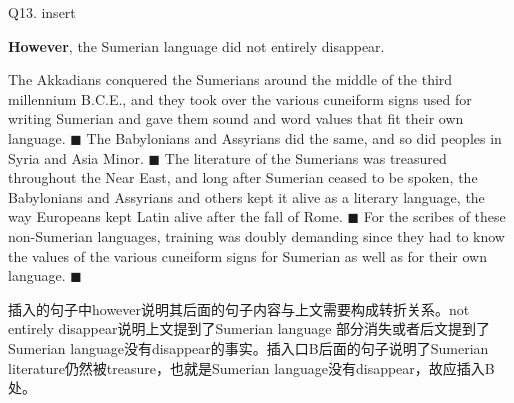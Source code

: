 \begin{blk}
    \begin{qst}
        Q13. insert

        \textbf{However}, the Sumerian language did not entirely disappear.
    \end{qst}

    \begin{psgq}
        The Akkadians conquered the Sumerians around the middle of the third millennium B.C.E., and they took over the various cuneiform signs used for writing Sumerian and gave them sound and word values that fit their own language. $\blacksquare$ The Babylonians and Assyrians did the same, and so did peoples in Syria and Asia Minor. $\blacksquare$ The literature of the Sumerians was treasured throughout the Near East, and long after Sumerian ceased to be spoken, the Babylonians and Assyrians and others kept it alive as a literary language, the way Europeans kept Latin alive after the fall of Rome. $\blacksquare$ For the scribes of these non-Sumerian languages, training was doubly demanding since they had to know the values of the various cuneiform signs for Sumerian as well as for their own language. $\blacksquare$
    \end{psgq}

    \begin{nlz}
        插入的句子中however说明其后面的句子内容与上文需要构成转折关系。not entirely disappear说明上文提到了Sumerian language 部分消失或者后文提到了Sumerian language没有disappear的事实。插入口B后面的句子说明了Sumerian literature仍然被treasure，也就是Sumerian language没有disappear，故应插入B处。
    \end{nlz}
\end{blk}


